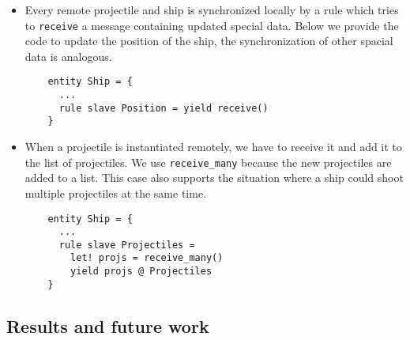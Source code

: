 \begin{itemize}[(i)]
	\item Every remote projectile and ship is synchronized locally by a rule which tries to \texttt{receive} a message containing updated special data. Below we provide the code to update the position of the ship, the synchronization of other spacial data is analogous.
	
	\begin{lstlisting}
	entity Ship = {
	  ...
	  rule slave Position = yield receive()
	}
	\end{lstlisting}
	
	\item When a projectile is instantiated remotely, we have to receive it and add it to the list of projectiles. We use \texttt{receive\_many} because the new projectiles are added to a list. This case also supports the situation where a ship could shoot multiple projectiles at the same time.

	\begin{lstlisting}
	entity Ship = {
	  ...
	  rule slave Projectiles =
	    let! projs = receive_many()
	    yield projs @ Projectiles
	}
	\end{lstlisting} 
\end{itemize}

\subsection*{Results and future work}